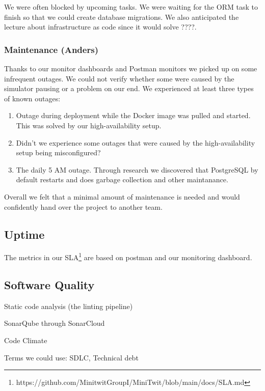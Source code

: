 \documentclass{article}
\begin{document}
We were often blocked by upcoming tasks. We were waiting for the ORM task to finish so that we could create database migrations. We also anticipated the lecture about infrastructure as code since it would solve ????.

\subsubsection{Maintenance (Anders)}

Thanks to our monitor dashboards and Postman monitors we picked up on some infrequent outages. We could not verify whether some were caused by the simulator pausing or a problem on our end. We experienced at least three types of known outages:

\begin{enumerate}
    \item Outage during deployment while the Docker image was pulled and started. This was solved by our high-availability setup. 
    \item Didn't we experience some outages that were caused by the high-availability setup being misconfigured?
    \item The daily 5 AM outage. Through research we discovered that PostgreSQL by default restarts and does garbage collection and other maintanance. 
\end{enumerate}

Overall we felt that a minimal amount of maintenance is needed and would confidently hand over the project to another team. 

\subsection{Uptime}

The metrics in our SLA\footnote{https://github.com/MinitwitGroupI/MiniTwit/blob/main/docs/SLA.md} are based on postman and our monitoring dashboard. 





\subsection{Software Quality}



Static code analysis (the linting pipeline)

SonarQube through SonarCloud 

Code Climate

Terms we could use: SDLC, Technical debt
\end{document}

